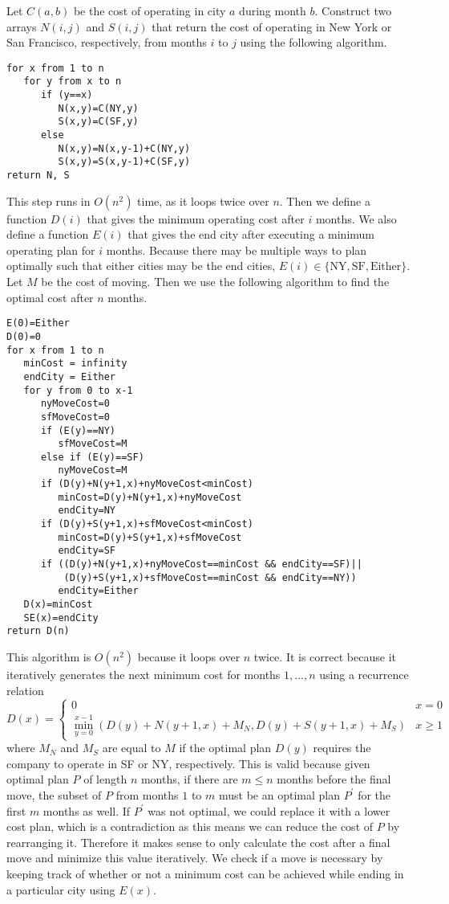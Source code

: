 \documentclass[12pt]{article}
\begin{document}
Let \(C(a,b)\) be the cost of operating in city \(a\) during month \(b\). Construct two arrays \(N(i,j)\) and \(S(i,j)\)
that return the cost of operating in New York or San Francisco, respectively, from months \(i\) to \(j\) using the following algorithm.
\begin{verbatim}
for x from 1 to n
   for y from x to n
      if (y==x)
         N(x,y)=C(NY,y)
         S(x,y)=C(SF,y)
      else
         N(x,y)=N(x,y-1)+C(NY,y)
         S(x,y)=S(x,y-1)+C(SF,y)
return N, S
\end{verbatim}
This step runs in \(O(n^2)\) time, as it loops twice over \(n\). Then we define a function \(D(i)\) that gives the minimum operating cost
after \(i\) months. We also define a function \(E(i)\) that gives the end city after executing a minimum operating plan for \(i\) months.
Because there may be multiple ways to plan optimally such that either cities may be the end cities,
\(E(i)\in\{\text{NY},\text{SF},\text{Either}\}\). Let \(M\) be the cost of moving. Then we use the following algorithm to find the
optimal cost after \(n\) months.
\begin{verbatim}
E(0)=Either
D(0)=0
for x from 1 to n
   minCost = infinity
   endCity = Either
   for y from 0 to x-1
      nyMoveCost=0
      sfMoveCost=0
      if (E(y)==NY)
         sfMoveCost=M
      else if (E(y)==SF)
         nyMoveCost=M
      if (D(y)+N(y+1,x)+nyMoveCost<minCost)
         minCost=D(y)+N(y+1,x)+nyMoveCost
         endCity=NY
      if (D(y)+S(y+1,x)+sfMoveCost<minCost)
         minCost=D(y)+S(y+1,x)+sfMoveCost
         endCity=SF
      if ((D(y)+N(y+1,x)+nyMoveCost==minCost && endCity==SF)||
          (D(y)+S(y+1,x)+sfMoveCost==minCost && endCity==NY))
         endCity=Either
   D(x)=minCost
   SE(x)=endCity
return D(n)
\end{verbatim}
This algorithm is \(O(n^2)\) because it loops over \(n\) twice. It is correct because it iteratively generates the next minimum cost for months \(1,\ldots,n\)
using a recurrence relation
\[D(x)=\begin{cases} 0 & x=0\\ \min\limits_{y=0}^{x-1} (D(y)+N(y+1,x)+M_N,D(y)+S(y+1,x)+M_S) & x\geq1 \end{cases}\]
where \(M_N\) and \(M_S\) are equal to \(M\) if the optimal plan \(D(y)\) requires the company to operate in SF or NY, respectively. This is valid because given
optimal plan \(P\) of length \(n\) months, if there are \(m\leq n\) months before the final move, the subset of \(P\) from months \(1\) to \(m\) must be an
optimal plan \(P^\prime\) for the first \(m\) months as well. If \(P^\prime\) was not optimal, we could replace it with a lower cost plan, which is a contradiction
as this means we can reduce the cost of \(P\) by rearranging it. Therefore it makes sense to only calculate the cost after a final move and minimize this value iteratively.
We check if a move is necessary by keeping track of whether or not a minimum cost can be achieved while ending in a particular city using \(E(x)\).
\end{document}
